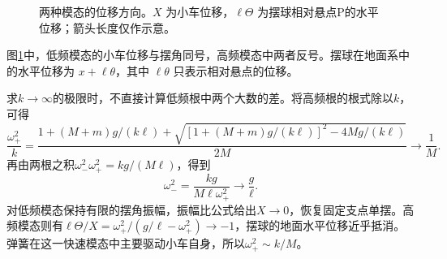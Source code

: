 \begin{solution}
\begin{figure}[H]
\caption{两种模态的位移方向。$X$ 为小车位移，$\ell\Theta$ 为摆球相对悬点P的水平位移；箭头长度仅作示意。}\label{sup4:fig:d7-e2-s}
\end{figure}
图\ref{sup4:fig:d7-e2-s}中，低频模态的小车位移与摆角同号，高频模态中两者反号。摆球在地面系中的水平位移为 $x+\ell\theta$，其中 $\ell\theta$ 只表示相对悬点的位移。

求$k\to\infty$的极限时，不直接计算低频根中两个大数的差。将高频根的根式除以$k$，可得
\[
\frac{\omega_+^2}{k}
=\frac{1+(M+m)g/(k\ell)+
\sqrt{[1+(M+m)g/(k\ell)]^2-4Mg/(k\ell)}}{2M}
\longrightarrow\frac1M.
\]
再由两根之积$\omega_-^2\omega_+^2=kg/(M\ell)$，得到
\[
\omega_-^2=\frac{kg}{M\ell\omega_+^2}\longrightarrow\frac g\ell.
\]
对低频模态保持有限的摆角振幅，振幅比公式给出$X\to0$，恢复固定支点单摆。高频模态则有$\ell\Theta/X=\omega_+^2/(g/\ell-\omega_+^2)\to-1$，摆球的地面水平位移近乎抵消。弹簧在这一快速模态中主要驱动小车自身，所以$\omega_+^2\sim k/M$。
\end{solution}



